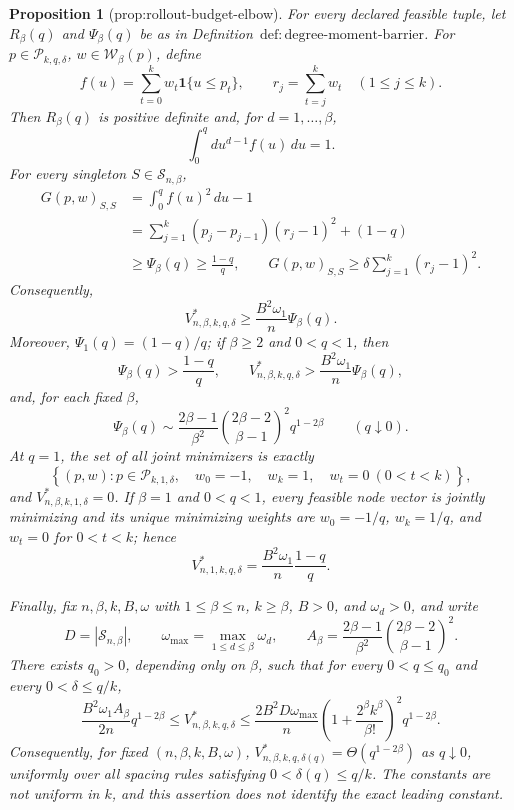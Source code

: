 \documentclass{article}
\newtheorem{proposition}{Proposition}
\begin{document}
\begin{proposition}[prop:rollout-budget-elbow]\label{prop:rollout-budget-elbow}
For every declared feasible tuple, let \(R_\beta(q)\) and \(\Psi_\beta(q)\) be as in Definition~\(\mathrm{def{:}degree\text{-}moment\text{-}barrier}\).  For \(p\in\mathcal P_{k,q,\delta}\), \(w\in\mathcal W_\beta(p)\), define
\[
f(u)=\sum_{t=0}^kw_t\mathbf 1\{u\le p_t\},
\qquad r_j=\sum_{t=j}^kw_t\quad(1\le j\le k).
\]
Then \(R_\beta(q)\) is positive definite and, for \(d=1,\ldots,\beta\),
\[
\int_0^q d u^{d-1}f(u)\,du=1.
\]
For every singleton \(S\in\mathcal S_{n,\beta}\),
\[
\begin{aligned}
G(p,w)_{S,S}
&=\int_0^q f(u)^2\,du-1\\
&=\sum_{j=1}^k(p_j-p_{j-1})(r_j-1)^2+(1-q)\\
&\ge \Psi_\beta(q)\ge\frac{1-q}{q},
\qquad
G(p,w)_{S,S}\ge\delta\sum_{j=1}^k(r_j-1)^2.
\end{aligned}
\]
Consequently,
\[
V^*_{n,\beta,k,q,\delta}\ge
\frac{B^2\omega_1}{n}\Psi_\beta(q).
\]
Moreover, \(\Psi_1(q)=(1-q)/q\); if \(\beta\ge2\) and \(0<q<1\), then
\[
\Psi_\beta(q)>\frac{1-q}{q},
\qquad
V^*_{n,\beta,k,q,\delta}>
\frac{B^2\omega_1}{n}\Psi_\beta(q),
\]
and, for each fixed \(\beta\),
\[
\Psi_\beta(q)\sim
\frac{2\beta-1}{\beta^2}
\binom{2\beta-2}{\beta-1}^{\!2}q^{1-2\beta}
\qquad(q\downarrow0).
\]
At \(q=1\), the set of all joint minimizers is exactly
\[
\left\{(p,w):p\in\mathcal P_{k,1,\delta},\quad
w_0=-1,\quad w_k=1,\quad w_t=0\ (0<t<k)\right\},
\]
and \(V^*_{n,\beta,k,1,\delta}=0\).  If \(\beta=1\) and \(0<q<1\), every feasible node vector is jointly minimizing and its unique minimizing weights are \(w_0=-1/q\), \(w_k=1/q\), and \(w_t=0\) for \(0<t<k\); hence
\[
V^*_{n,1,k,q,\delta}=\frac{B^2\omega_1}{n}\frac{1-q}{q}.
\]

Finally, fix \(n,\beta,k,B,\omega\) with \(1\le\beta\le n\), \(k\ge\beta\), \(B>0\), and \(\omega_d>0\), and write
\[
D=|\mathcal S_{n,\beta}|,\qquad
\omega_{\max}=\max_{1\le d\le\beta}\omega_d,\qquad
A_\beta=\frac{2\beta-1}{\beta^2}\binom{2\beta-2}{\beta-1}^{\!2}.
\]
There exists \(q_0>0\), depending only on \(\beta\), such that for every \(0<q\le q_0\) and every \(0<\delta\le q/k\),
\[
\frac{B^2\omega_1A_\beta}{2n}q^{1-2\beta}
\le V^*_{n,\beta,k,q,\delta}
\le \frac{2B^2D\omega_{\max}}{n}
\left(1+\frac{2^\beta k^\beta}{\beta!}\right)^2q^{1-2\beta}.
\]
Consequently, for fixed \((n,\beta,k,B,\omega)\),
\(V^*_{n,\beta,k,q,\delta(q)}=\Theta(q^{1-2\beta})\) as \(q\downarrow0\), uniformly over all spacing rules satisfying \(0<\delta(q)\le q/k\).  The constants are not uniform in \(k\), and this assertion does not identify the exact leading constant.
\end{proposition}
\end{document}
